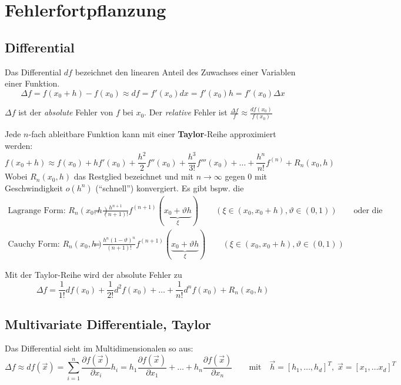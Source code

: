 \section{Fehlerfortpflanzung}

\subsection{Differential}
  Das Differential $df$ bezeichnet den linearen Anteil des Zuwachses einer Variablen einer Funktion.
  \[
      \Delta f = f(x_0+h)-f(x_0) \approx df = f'(x_o) dx = f'(x_0) h = f'(x_0) \Delta x
  \]
  
  $\Delta f$ ist der \emph{absolute} Fehler von $f$ bei $x_0$.
  Der \emph{relative} Fehler ist $\frac{\Delta f}{f} \approx \frac{df(x_0)}{f(x_0)}$
  
  Jede $n$-fach ableitbare Funktion kann mit einer \textbf{Taylor}-Reihe approximiert werden:
  $$f(x_0+h) \approx f(x_0) + h f'(x_0) + \frac{h^2}{2} f''(x_0) + \frac{h^3}{3!} f'''(x_0) + 
  \ldots + \frac{h^n}{n!} f^{(n)} + R_n(x_0,h)$$
  Wobei $R_n(x_0,h)$ das Restglied bezeichnet und mit $n \rightarrow \infty$ gegen $0$ mit 
  Geschwindigkeit $o(h^n)$ ("`schnell"') konvergiert. Es gibt bspw. die 
  \begin{align*}
    \text{Lagrange Form: } R_n(x_0,h) &= \frac{h^{n+1}}{(n+1)!} f^{(n+1)}(\underbrace{x_0 + \vartheta h}_{\xi})
    \qquad (\xi \in (x_0, x_0+h), \vartheta \in (0,1)) \qquad \text{oder die }\\
    \text{Cauchy Form: } R_n(x_0,h) &= \frac{h^n(1-\vartheta)^n}{(n+1)!} f^{(n+1)}(\underbrace{x_0 + \vartheta h}_{\xi})
    \qquad (\xi \in (x_0, x_0+h), \vartheta \in (0,1))
  \end{align*}
  
  Mit der Taylor-Reihe wird der absolute Fehler zu
  \[
      \Delta f = \frac{1}{1!}df(x_0) + \frac{1}{2!}d^2f(x_0) + \ldots + \frac{1}{n!}d^n f(x_0) + R_n(x_0,h)
  \]
  
   
\subsection{Multivariate Differentiale, Taylor}
  Das Differential sieht im Multidimensionalen so aus:
  \[
      \Delta f \approx df(\vec{x}) = \sum\limits_{i=1}^n \frac{\partial f(\vec{x})}{\partial x_i} h_i = h_1 \frac{\partial f(\vec{x})}{\partial x_1} + \ldots + 
      h_n \frac{\partial f(\vec{x})}{\partial x_n} \qquad \text{mit} \quad \vec{h} = [h_1, \ldots, h_d]^T, \; \vec{x} = [x_1, \ldots x_d]^T
  \]

